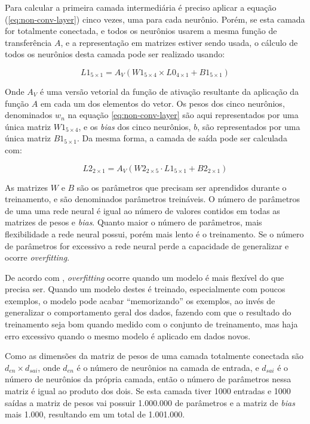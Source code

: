 Para calcular a primeira camada intermediária é preciso aplicar a equação
(\ref{eq:non-conv-layer}) cinco vezes, uma para cada neurônio. Porém, se
esta camada for totalmente conectada, e todos os neurônios usarem a
mesma função de transferência $A$, e a representação em matrizes estiver
sendo usada, o cálculo de todos os neurônios desta camada pode ser
realizado usando:

\begin{equation}
	L1_{5 \times 1}=A_V \left( W1_{5 \times 4} \times L0_{4 \times 1}
		+ B1_{5 \times 1} \right)
\end{equation}

Onde $A_V$ é uma versão vetorial da função de ativação resultante
da aplicação da função $A$ em cada um dos elementos do vetor.
Os pesos dos cinco neurônios, denominados $w_n$ na equação
\ref{eq:non-conv-layer} são aqui representados por uma única matriz
$W1_{5 \times 4}$, e os \emph{bias} dos cinco neurônios, $b$, são representados
por uma única matriz $B1_{5 \times 1}$. Da mesma forma, a camada de saída
pode ser calculada com:

\begin{equation}
	L2_{2 \times 1}=A_V \left( W2_{2 \times 5} \cdot L1_{5 \times 1}
		+ B2_{2 \times 1} \right)
\end{equation}

As matrizes $W$ e $B$ são os parâmetros que precisam ser aprendidos durante o
treinamento, e são denominados parâmetros treináveis. O número de parâmetros
de uma uma
rede neural é igual ao número de valores contidos em todas as matrizes de pesos
e \emph{bias}. Quanto maior o número de parâmetros, mais flexibilidade a rede
neural possui, porém mais lento é o treinamento. Se o número de parâmetros for
excessivo a rede neural perde a capacidade de generalizar e ocorre
\emph{overfitting}.

De acordo com \cite{hawkins2004problem}, \emph{overfitting} ocorre quando um
modelo é mais flexível do que precisa ser. Quando um modelo destes é treinado,
especialmente com poucos exemplos, o modelo pode acabar ``memorizando'' os
exemplos, ao invés de generalizar o comportamento geral dos dados, fazendo
com que o resultado do treinamento seja bom quando medido com o conjunto de
treinamento, mas haja erro excessivo quando o mesmo modelo é aplicado em
dados novos.

Como as dimensões da matriz de pesos de uma camada totalmente conectada são
$d_{en} \times d_{sai}$, onde $d_{en}$ é o número de neurônios na camada de
entrada, e $d_{sai}$ é o número de neurônios da própria camada, então o número
de parâmetros nessa matriz é igual ao produto dos dois. Se esta camada
tiver 1000 entradas e 1000 saídas a matriz de pesos vai possuir 1.000.000 de
parâmetros e a matriz de \emph{bias} mais 1.000, resultando em um total de
1.001.000.

